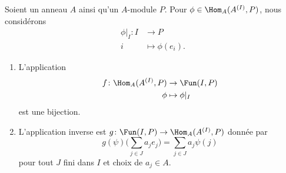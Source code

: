 \begin{theorem}      \label{THOooPDZCooJnHbOd}
    Soient un anneau \( A\) ainsi qu'un \( A\)-module \( P\). Pour \( \phi\in\Hom_A(A^{(I)}, P)\), nous considérons
    \begin{equation}
        \begin{aligned}
            \phi|_I\colon I&\to P \\
            i&\mapsto \phi(e_i). 
        \end{aligned}
    \end{equation}
    \begin{enumerate}
        \item
            
    L'application
    \begin{equation}
        \begin{aligned}
            f\colon \Hom_A(A^{(I)},P)&\to \Fun(I,P) \\
            \phi&\mapsto \phi|_I 
        \end{aligned}
    \end{equation}
    est une bijection.
\item
    L'application inverse est \( g\colon \Fun(I,P)\to \Hom_A(A^{(I)},P) \) donnée par
    \begin{equation}
        g(\psi)\big( \sum_{j\in J}a_je_j \big)=\sum_{j\in J}a_j\psi(j)
    \end{equation}
    pour tout \( J\) fini dans \( I\) et choix de \( a_j\in A\).
    \end{enumerate}
\end{theorem}

